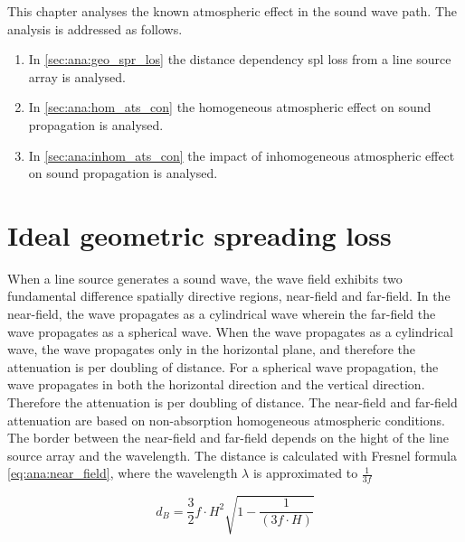 
This chapter analyses the known atmospheric effect in the sound wave path. The analysis is addressed as follows.  

\begin{enumerate}
\item In \autoref{sec:ana:geo_spr_los} the distance dependency \gls{spl} loss from a line source array is analysed. 
\item In \autoref{sec:ana:hom_ats_con} the homogeneous atmospheric effect on sound propagation is analysed.
\item In  \autoref{sec:ana:inhom_ats_con} the  impact of  inhomogeneous atmospheric effect on sound propagation is analysed.
\end{enumerate}



\section{Ideal geometric spreading loss}\label{sec:ana:geo_spr_los}
When a line source generates a sound wave, the wave field exhibits two fundamental difference spatially directive regions, near-field and far-field. In the near-field, the wave propagates as a cylindrical wave wherein the far-field the wave propagates as a spherical wave. When the wave propagates as a cylindrical wave, the wave propagates only in the horizontal plane, and therefore the attenuation is  per doubling of distance. For a spherical wave propagation, the wave propagates in both the horizontal direction and the vertical direction. Therefore the attenuation is  per doubling of distance. The near-field and far-field attenuation are based on non-absorption homogeneous atmospheric conditions. The border between the near-field and far-field depends on the hight of the line source array and the wavelength. The distance is calculated with Fresnel formula \autoref{eq:ana:near_field}, where the wavelength $\lambda$ is approximated to $\frac{1}{3f}$ \citep{bauman2001wavefront}

\begin{equation}\label{eq:ana:near_field}
d_{B} = \frac{3}{2}f \cdot H^{2}\sqrt{1-\frac{1}{(3f \cdot H)}}
\end{equation}

\startexplain
{}
\stopexplain

